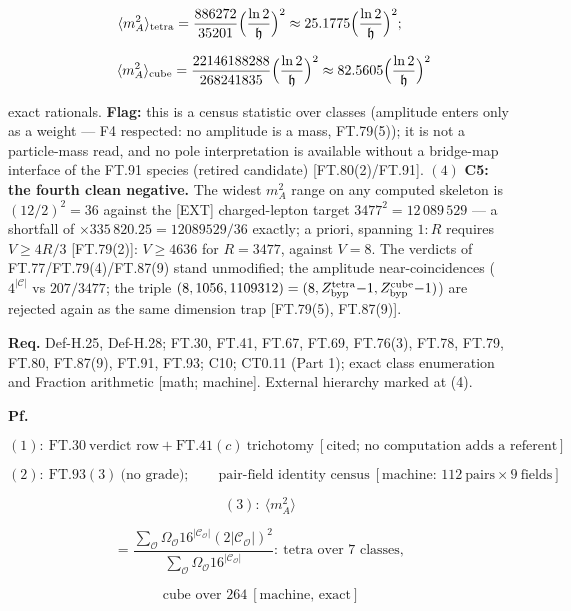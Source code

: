 \documentclass[11pt,openany]{report}
\theoremstyle{canonplain}
\theoremstyle{canondef}
\begin{document}
\[
\langle m_A^2\rangle_{\mathrm{tetra}}=\frac{886272}{35201}\Bigl(\frac{\ln2}{\mathfrak h}\Bigr)^2\approx25.1775\Bigl(\frac{\ln2}{\mathfrak h}\Bigr)^2;
\]

\[
\qquad \langle m_A^2\rangle_{\mathrm{cube}}=\frac{22146188288}{268241835}\Bigl(\frac{\ln2}{\mathfrak h}\Bigr)^2\approx82.5605\Bigl(\frac{\ln2}{\mathfrak h}\Bigr)^2
\]

exact rationals. \textbf{Flag:} this is a census statistic over classes (amplitude enters only as a weight — F4 respected: no amplitude is a mass, FT.79(5)); it is not a particle-mass read, and no pole interpretation is available without a bridge-map interface of the FT.91 species (retired candidate) [FT.80(2)/FT.91]. $(4)$ \textbf{C5: the fourth clean negative.} The widest $m_A^2$ range on any computed skeleton is $(12/2)^2=36$ against the [EXT] charged-lepton target $3477^2=12\,089\,529$ — a shortfall of $\times335\,820.25=12089529/36$ exactly; a priori, spanning $1{:}R$ requires $V\ge4R/3$ [FT.79(2)]: $V\ge4636$ for $R=3477$, against $V=8$. The verdicts of FT.77/FT.79(4)/FT.87(9) stand unmodified; the amplitude near-coincidences ($4^{|\mathcal C|}$ vs $207/3477$; the triple $(8,1056,1109312)=(8,Z^{\rm tetra}_{\rm byp}{-}1,Z^{\rm cube}_{\rm byp}{-}1)$) are rejected again as the same dimension trap [FT.79(5), FT.87(9)].

\textbf{Req.} Def-H.25, Def-H.28; FT.30, FT.41, FT.67, FT.69, FT.76(3), FT.78, FT.79, FT.80, FT.87(9), FT.91, FT.93; C10; CT0.11 (Part 1); exact class enumeration and Fraction arithmetic [math; machine]. External hierarchy marked at (4).

\textbf{Pf.}

\[
(1):\ \mathrm{FT.30}\ \text{verdict row} + \mathrm{FT.41}(c)\ \text{trichotomy}\ [\text{cited; no computation adds a referent}]
\]

\[
(2):\ \mathrm{FT.93}(3)\ \text{(no grade)};\qquad\text{pair-field identity census}\ [\text{machine: }112\ \text{pairs}\times9\ \text{fields}]
\]

\[
(3):\ \langle m_A^2\rangle
\]

\[
= \frac{\sum_{\mathcal O}\Omega_{\mathcal O}16^{|\mathcal C_{\mathcal O}|}(2|\mathcal C_{\mathcal O}|)^2}{\sum_{\mathcal O}\Omega_{\mathcal O}16^{|\mathcal C_{\mathcal O}|}}:\ \text{tetra over }7\text{ classes},
\]

\[
\ \text{cube over }264\ [\text{machine, exact}]
\]
\end{document}
